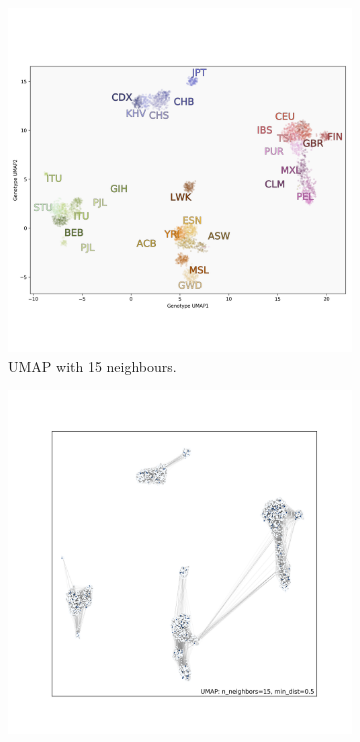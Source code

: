 \documentclass[12pt]{article}
\begin{document}
\clearpage

\begin{figure}[h!]
  \centering
  \begin{subfigure}[b]{0.48\linewidth}
    \includegraphics[width=\linewidth]{code/images/1KGP_genotype_UMAP_low_NN.png}
    \caption{UMAP with 15 neighbours.}
    \label{fig:UMAP_low_NN_1KGP}
  \end{subfigure}
  \begin{subfigure}[b]{0.48\linewidth}
    \includegraphics[width=\linewidth]{code/images/UMAP_connectivity_low_NN.png}

\end{subfigure}
\end{figure}
\end{document}
